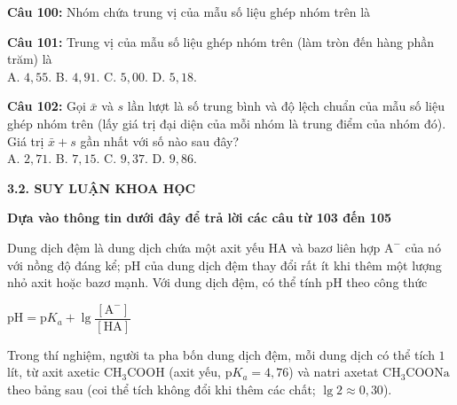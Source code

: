 \documentclass[12pt,a4paper]{article}
\begin{document}
\par\nobreak


\noindent \textbf{Câu 100:} Nhóm chứa trung vị của mẫu số liệu ghép nhóm trên là\\
\noindent\makebox[0.24\textwidth][l]{A. $[2;4)$.}\makebox[0.24\textwidth][l]{B. $[6;8)$.}\makebox[0.24\textwidth][l]{C. $[8;10)$.}\makebox[0.24\textwidth][l]{D. $[4;6)$.}



\vspace{0.3cm}

\noindent \textbf{Câu 101:} Trung vị của mẫu số liệu ghép nhóm trên (làm tròn đến hàng phần trăm) là\\
\noindent A. $4{,}55$. \hfill B. $4{,}91$. \hfill C. $5{,}00$. \hfill D. $5{,}18$.



\vspace{0.3cm}

\noindent \textbf{Câu 102:} Gọi $\bar{x}$ và $s$ lần lượt là số trung bình và độ lệch chuẩn của mẫu số liệu ghép nhóm trên (lấy giá trị đại diện của mỗi nhóm là trung điểm của nhóm đó). Giá trị $\bar{x}+s$ gần nhất với số nào sau đây?\\
\noindent A. $2{,}71$. \hfill B. $7{,}15$. \hfill C. $9{,}37$. \hfill D. $9{,}86$.



\vspace{0.5cm}
\par\nobreak

\noindent\textbf{3.2. SUY LUẬN KHOA HỌC}

\noindent\textbf{Dựa vào thông tin dưới đây để trả lời các câu từ 103 đến 105}%


\par\nobreak

Dung dịch đệm là dung dịch chứa một axit yếu $\mathrm{HA}$ và bazơ liên hợp $\mathrm{A^-}$ của nó với nồng độ đáng kể; pH của dung dịch đệm thay đổi rất ít khi thêm một lượng nhỏ axit hoặc bazơ mạnh. Với dung dịch đệm, có thể tính pH theo công thức
\begin{center}$\mathrm{pH}=\mathrm{p}K_a+\lg\dfrac{[\mathrm{A^-}]}{[\mathrm{HA}]}$\end{center}
Trong thí nghiệm, người ta pha bốn dung dịch đệm, mỗi dung dịch có thể tích $1$ lít, từ axit axetic $\mathrm{CH_3COOH}$ (axit yếu, $\mathrm{p}K_a=4{,}76$) và natri axetat $\mathrm{CH_3COONa}$ theo bảng sau (coi thể tích không đổi khi thêm các chất; $\lg 2\approx 0{,}30$).
\end{document}
